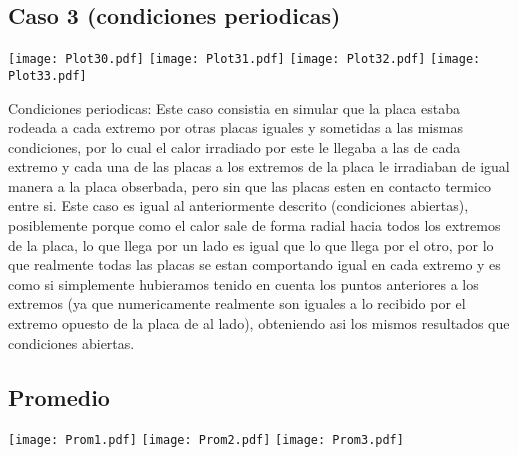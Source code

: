 \documentclass[a4paper,11pt]{article}
\begin{document}
\subsection{Caso 3 (condiciones periodicas)}

\texttt{[image: Plot30.pdf]}
\texttt{[image: Plot31.pdf]}
\texttt{[image: Plot32.pdf]}
\texttt{[image: Plot33.pdf]}

Condiciones periodicas: Este caso consistia en simular que la placa estaba rodeada a cada extremo por otras placas iguales y sometidas a las mismas condiciones, por lo cual el calor irradiado por este le llegaba a las de cada extremo y cada una de las placas a los extremos de la placa le irradiaban de igual manera a la placa obserbada, pero sin que las placas esten en contacto termico entre si. Este caso es igual al anteriormente descrito (condiciones abiertas), posiblemente porque como el calor sale de forma radial hacia todos los extremos de la placa, lo que llega por un lado es igual que lo que llega por el otro, por lo que realmente todas las placas se estan comportando igual en cada extremo y es como si simplemente hubieramos tenido en cuenta los puntos anteriores a los extremos (ya que numericamente realmente son iguales a lo recibido por el extremo opuesto de la placa de al lado), obteniendo asi los mismos resultados que condiciones abiertas.

\subsection{Promedio}

\texttt{[image: Prom1.pdf]}
\texttt{[image: Prom2.pdf]}
\texttt{[image: Prom3.pdf]}
\end{document}
